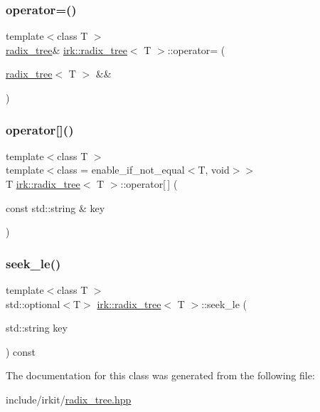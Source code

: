 \subsubsection{\texorpdfstring{operator=()}{operator=()}\hspace{0.1cm}{\footnotesize\ttfamily [2/2]}}
{\footnotesize\ttfamily template$<$class T $>$ \\
\mbox{\hyperlink{classirk_1_1radix__tree}{radix\+\_\+tree}}\& \mbox{\hyperlink{classirk_1_1radix__tree}{irk\+::radix\+\_\+tree}}$<$ T $>$\+::operator= (\begin{DoxyParamCaption}\item[{\mbox{\hyperlink{classirk_1_1radix__tree}{radix\+\_\+tree}}$<$ T $>$ \&\&}]{ }\end{DoxyParamCaption})\hspace{0.3cm}{\ttfamily [delete]}}

\mbox{\label{classirk_1_1radix__tree_af46c8d034084c54b33bb761ec96588d4}} 
\subsubsection{\texorpdfstring{operator[]()}{operator[]()}}
{\footnotesize\ttfamily template$<$class T $>$ \\
template$<$class  = enable\+\_\+if\+\_\+not\+\_\+equal$<$\+T, void$>$$>$ \\
T \mbox{\hyperlink{classirk_1_1radix__tree}{irk\+::radix\+\_\+tree}}$<$ T $>$\+::operator\mbox{[}$\,$\mbox{]} (\begin{DoxyParamCaption}\item[{const std\+::string \&}]{key }\end{DoxyParamCaption})\hspace{0.3cm}{\ttfamily [inline]}}

\mbox{\label{classirk_1_1radix__tree_aec3e27fbf3cd3f0e2d75183d392b0946}} 
\subsubsection{\texorpdfstring{seek\+\_\+le()}{seek\_le()}}
{\footnotesize\ttfamily template$<$class T $>$ \\
std\+::optional$<$T$>$ \mbox{\hyperlink{classirk_1_1radix__tree}{irk\+::radix\+\_\+tree}}$<$ T $>$\+::seek\+\_\+le (\begin{DoxyParamCaption}\item[{std\+::string}]{key }\end{DoxyParamCaption}) const\hspace{0.3cm}{\ttfamily [inline]}}



The documentation for this class was generated from the following file\+:\begin{DoxyCompactItemize}
\item 
include/irkit/\mbox{\hyperlink{radix__tree_8hpp}{radix\+\_\+tree.\+hpp}}\end{DoxyCompactItemize}
